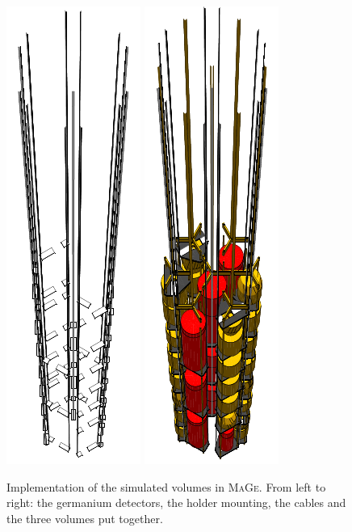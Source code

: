 \begin{figure}[t]
{		\includegraphics{img/cables.pdf}%
		\includegraphics{img/all.pdf}%
	}%
	\caption{Implementation of the simulated volumes in \textsc{MaGe}. From left to right: the germanium detectors, the holder mounting, the cables and the three volumes put together.}\label{fig:volumes}
\end{figure}

